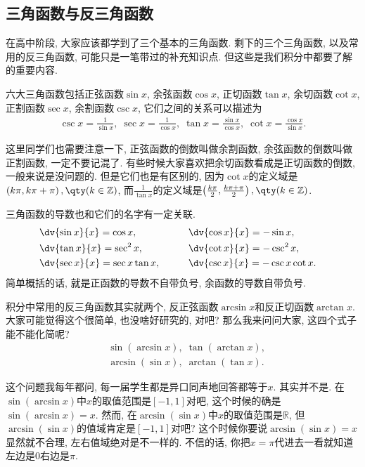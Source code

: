 \documentclass{ctexbook}
\begin{document}
{\subsection{三角函数与反三角函数}
在高中阶段, 大家应该都学到了三个基本的三角函数. 剩下的三个三角函数, 以及常用的反三角函数, 可能只是一笔带过的补充知识点. 但这些是我们积分中都要了解的重要内容. \par
六大三角函数包括正弦函数$\sin{x}$, 余弦函数$\cos{x}$, 正切函数$\tan{x}$, 余切函数$\cot{x}$, 正割函数$\sec{x}$, 余割函数$\csc{x}$, 它们之间的关系可以描述为
\begin{align*}
\csc{x}=\frac{1}{\sin{x}},\;\sec{x}=\frac{1}{\cos{x}},\;\tan{x}=\frac{\sin{x}}{\cos{x}},\;\cot{x}=\frac{\cos{x}}{\sin{x}}
.\end{align*}\par
这里同学们也需要注意一下, 正弦函数的倒数叫做余割函数, 余弦函数的倒数叫做正割函数, 一定不要记混了. 有些时候大家喜欢把余切函数看成是正切函数的倒数, 一般来说是没问题的. 但是它们也是有区别的, 因为$\cot{x}$的定义域是$\left(k\pi,k\pi+\pi\right),\qty(k\in\mathbb{Z})$, 而$\frac{1}{\tan{x}}$的定义域是$\left(\frac{k\pi}{2},\frac{k\pi+\pi}{2}\right),\qty(k\in\mathbb{Z})$. \par
三角函数的导数也和它们的名字有一定关联. 
\begin{alignat*}{2}
\begin{aligned}
&\dv{\sin{x}}{x}=\cos{x},\\
&\dv{\tan{x}}{x}=\sec^{2}{x},\\
&\dv{\sec{x}}{x}=\sec{x}\tan{x},
\end{aligned}
\qquad&&&
\begin{aligned}
&\dv{\cos{x}}{x}=-\sin{x},\\
&\dv{\cot{x}}{x}=-\csc^{2}{x},\\
&\dv{\csc{x}}{x}=-\csc{x}\cot{x}.
\end{aligned}
\end{alignat*}
简单概括的话, 就是正函数的导数不自带负号, 余函数的导数自带负号. \par
积分中常用的反三角函数其实就两个, 反正弦函数$\arcsin{x}$和反正切函数$\arctan{x}$. 大家可能觉得这个很简单, 也没啥好研究的, 对吧? 那么我来问问大家, 这四个式子能不能化简呢? 
\begin{align*}
{}&\sin(\arcsin{x}),\;\tan(\arctan{x}),\\
{}&\arcsin(\sin{x}),\;\arctan(\tan{x})
.\end{align*}\par
这个问题我每年都问, 每一届学生都是异口同声地回答都等于$x$. 其实并不是. 在$\sin(\arcsin{x})$中$x$的取值范围是$\left[-1,1\right]$对吧, 这个时候的确是$\sin(\arcsin{x})=x$. 然而, 在$\arcsin(\sin{x})$中$x$的取值范围是$\mathbb{R}$, 但$\arcsin(\sin{x})$的值域肯定是$\left[-1,1\right]$对吧? 这个时候你要说$\arcsin(\sin{x})=x$显然就不合理, 左右值域绝对是不一样的. 不信的话, 你把$x=\pi$代进去一看就知道左边是$0$右边是$\pi$. \par
}
\end{document}
